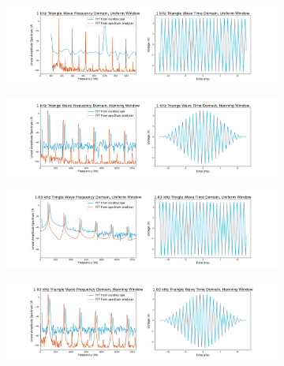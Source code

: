 \documentclass[12pt]{article}
\begin{document}
    \begin{figure}[!ht]
        \centering
        \begin{subfigure}[h]{\textwidth}
        \includegraphics[width=\textwidth]{1 kHz Triangle Wave (uniform)}
        \caption{}
        \label{fig:1 triangle uniform}
        \end{subfigure}
        \begin{subfigure}[h]{\textwidth}
        \includegraphics[width=\textwidth]{1 kHz Triange Wave (hanning)}
        \caption{}
        \label{fig:1 triangle hanning}
        \end{subfigure}
        \begin{subfigure}[h]{\textwidth}
        \includegraphics[width=\textwidth]{1_03 kHz Tringle Wave (uniform)}
        \caption{}
        \label{fig:1.03 triangle uniform}
        \end{subfigure}
        \begin{subfigure}[h]{\textwidth}
        \includegraphics[width=\textwidth]{1_03 kHz Triangle Wave (hanning)}
        \caption{}
        \label{fig:1.03 triangle hanning}
        \end{subfigure}
    \end{figure} %
    
\end{document}
